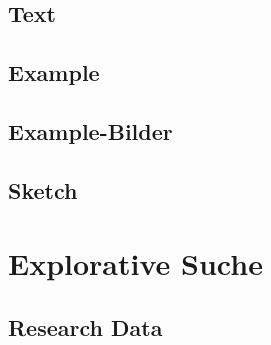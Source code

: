 \documentclass[a4paper, 11pt, accentcolor = tud3b]{tudreport}
\begin{document}
			\subsection{Text} %

			\subsection{Example} %

			\subsection{Example-Bilder} %

			\subsection{Sketch} %

		\section{Explorative Suche} %

			\subsection{Research Data} %
\end{document}
